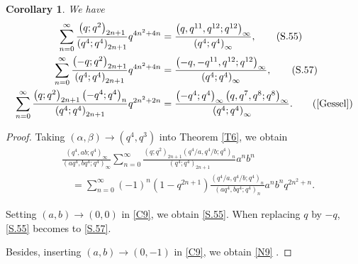\documentclass[reqno,12pt]{amsart}
\newtheorem{corollary}[theorem]{Corollary}
\theoremstyle{remark}
\numberwithin{equation}{section}
\begin{document}
\begin{corollary}
We have
\begin{align}
\sum_{n=0}^{\infty}\frac{\left(q;q^2\right)_{2n+1}}
{\left(q^4;q^4\right)_{2n+1}}q^{4n^2+4n}
&=\frac{\left(q,q^{11},q^{12};q^{12}\right)_{\infty}}{\left(q^4;q^4\right)_{\infty}},
\tag{S.55}\label{S.55}\\
\sum_{n=0}^{\infty}\frac{\left(-q;q^2\right)_{2n+1}}
{\left(q^4;q^4\right)_{2n+1}}q^{4n^2+4n}
&=\frac{\left(-q,-q^{11},q^{12};q^{12}\right)_{\infty}}{\left(q^4;q^4\right)_{\infty}},
\tag{S.57}\label{S.57}
\\
\sum_{n=0}^{\infty}\frac{\left(q;q^2\right)_{2n+1}\left(-q^4;q^4\right)_n}
{\left(q^4;q^4\right)_{2n+1}}q^{2n^2+2n}
&=\frac{\left(-q^4;q^4\right)_{\infty}\left(q,q^7,q^{8};q^{8}\right)_{\infty}}
{\left(q^4;q^4\right)_{\infty}}.\tag{\rm{\cite[Eq. (7.25)]{Gessel}}}\label{N9}
\end{align}
\end{corollary}

\begin{proof}
Taking $\left(\alpha,\beta\right)\to\left(q^4,q^3\right)$ into Theorem \ref{T6}, we obtain
\begin{align}
&\frac{\left(q^4,ab;q^4\right)_{\infty}}{\left(aq^4,bq^4;q^4\right)_{\infty}}
\sum_{n=0}^{\infty}\frac{\left(q;q^2\right)_{2n+1}\left(q^4/a,q^4/b;q^4\right)_n}{\left(q^4;q^4\right)_{2n+1}}a^nb^n\nonumber\\
&\quad=
\sum_{n=0}^{\infty}\left(-1\right)^n\left(1-q^{2n+1}\right)
\frac{\left(q^4/a,q^4/b;q^4\right)_n}{\left(aq^4,bq^4;q^4\right)_n}a^nb^nq^{2n^2+n}.\label{C9}
\end{align}

Setting $\left(a,b\right)\to\left(0,0\right)$ in \eqref{C9},
 we obtain \eqref{S.55}. When replacing $q$ by $-q$, \eqref{S.55} becomes to \eqref{S.57}.
 
Besides, inserting  $\left(a,b\right)\to\left(0,-1\right)$ in \eqref{C9},  we obtain \ref{N9} .
\end{proof}

\end{document}
